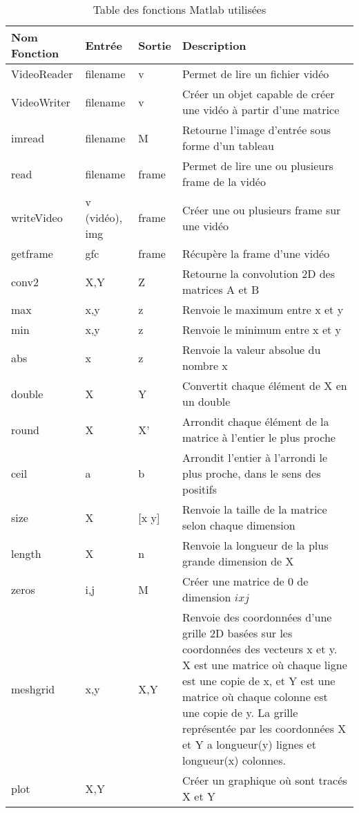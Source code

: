 \documentclass[blue]{ceri/sty/rapport}
\begin{document}
\begin{table}[H]
\caption{Table des fonctions Matlab utilisées}
\centering
{}
\begin{tabular}{m{4cm} m{2cm} m{2cm} m{6cm}}
\hline
\rowcolor{fgLightRed}
\textbf{Nom Fonction} & \textbf{Entrée} & \textbf{Sortie} & \textbf{Description} \\
\hline

VideoReader & filename & v &  Permet de lire un fichier vidéo\\
VideoWriter & filename & v & Créer un objet capable de créer une vidéo à partir d'une matrice\\
imread & filename & M & Retourne l'image d'entrée sous forme d'un tableau \\
read & filename & frame & Permet de lire une ou plusieurs frame de la vidéo\\
writeVideo & v (vidéo), img & frame & Créer une ou plusieurs frame sur une vidéo\\
getframe & gfc & frame & Récupère la frame d'une vidéo \\
conv2& X,Y & Z & Retourne la convolution 2D des matrices A et B\\
max & x,y & z & Renvoie le maximum entre x et y \\
min & x,y & z & Renvoie le minimum entre x et y\\
abs & x & z & Renvoie la valeur absolue du nombre x\\
double & X & Y & Convertit chaque élément de X en un double\\
round & X & X' & Arrondit chaque élément de la matrice à l'entier le plus proche \\
ceil& a & b & Arrondit l'entier à l'arrondi le plus proche, dans le sens des positifs \\
size & X & [x y] & Renvoie la taille de la matrice selon chaque dimension\\
length & X & n & Renvoie la longueur de la plus grande dimension de X\\
zeros & i,j & M & Créer une matrice de 0 de dimension $ixj$ \\
meshgrid & x,y & X,Y & Renvoie des coordonnées d'une grille 2D basées sur les coordonnées des vecteurs x et y. X est une matrice où chaque ligne est une copie de x, et Y est une matrice où chaque colonne est une copie de y. La grille représentée par les coordonnées X et Y a longueur(y) lignes et longueur(x) colonnes.\\
plot & X,Y & & Créer un graphique où sont tracés X et Y\\
\hline
\end{tabular}
\label{tab:exemple2}
\end{table}
\end{document}
